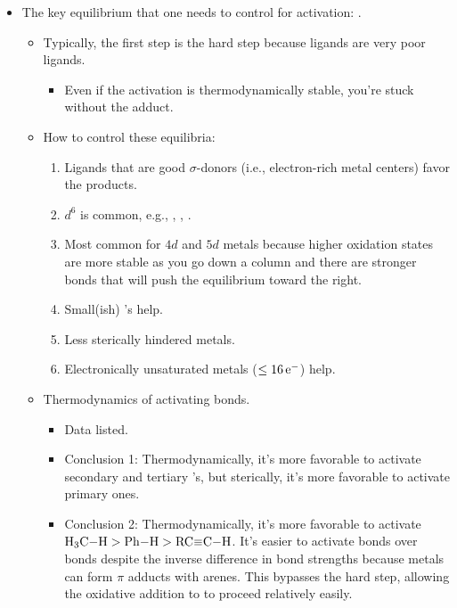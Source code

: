 \documentclass[../notes.tex]{subfiles}
\begin{document}
\begin{itemize}
\begin{itemize}
\begin{itemize}
        \end{itemize}
    \end{itemize}
    \item The key equilibrium that one needs to control for  activation: .
    \begin{itemize}
        \item Typically, the first step is the hard step because  ligands are very poor ligands.
        \begin{itemize}
            \item Even if the  activation is thermodynamically stable, you're stuck without the adduct.
        \end{itemize}
        \item How to control these equilibria:
        \begin{enumerate}
            \item Ligands that are good $\sigma$-donors (i.e., electron-rich metal centers) favor the products.
            \item {} $d^6$ is common, e.g., , , .
            \item Most common for $4d$ and $5d$ metals because higher oxidation states are more stable as you go down a column and there are stronger bonds that will push the equilibrium toward the right.
            \item Small(ish) 's help.
            \item Less sterically hindered metals.
            \item Electronically unsaturated metals ($\leq 16\,\e[-]$) help.
        \end{enumerate}
        \item Thermodynamics of activating  bonds.
        \begin{itemize}
            \item Data listed.
            \item Conclusion 1: Thermodynamically, it's more favorable to activate secondary and tertiary 's, but sterically, it's more favorable to activate primary ones.
            \item Conclusion 2: Thermodynamically, it's more favorable to activate $\ce{H3C-H}>\ce{Ph-H}>\ce{RC#C-H}$. It's easier to activate  bonds over  bonds despite the inverse difference in bond strengths because metals can form $\pi$ adducts with arenes. This bypasses the hard step, allowing the oxidative addition to  to proceed relatively easily.

\end{itemize}
\end{itemize}
\end{itemize}
\end{document}
